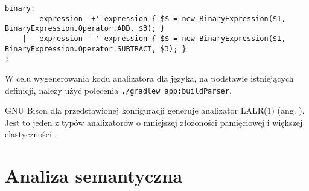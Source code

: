 \begin{lstlisting}
binary:
        expression '+' expression { $$ = new BinaryExpression($1, BinaryExpression.Operator.ADD, $3); }
    |   expression '-' expression { $$ = new BinaryExpression($1, BinaryExpression.Operator.SUBTRACT, $3); }
;
\end{lstlisting}

W celu wygenerowania kodu analizatora dla języka, na podstawie istniejących definicji, należy użyć polecenia \lstinline|./gradlew app:buildParser|.

GNU Bison dla przedstawionej konfiguracji generuje analizator LALR(1) (ang. ). Jest to jeden z typów analizatorów o mniejszej złożoności pamięciowej i większej elastyczności \cite{baqaiComparisonParsingTechniques}.

\section{Analiza semantyczna}

